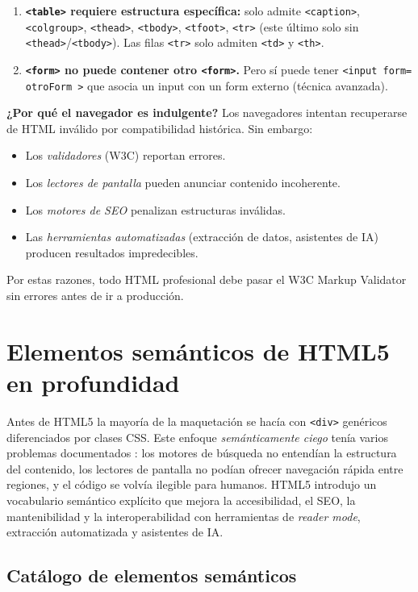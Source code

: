 \begin{enumerate}
\item \textbf{\texttt{<table>} requiere estructura específica:}
solo admite \texttt{<caption>}, \texttt{<colgroup>}, \texttt{<thead>},
\texttt{<tbody>}, \texttt{<tfoot>}, \texttt{<tr>} (este último solo
sin \texttt{<thead>}/\texttt{<tbody>}). Las filas \texttt{<tr>} solo
admiten \texttt{<td>} y \texttt{<th>}.

\item \textbf{\texttt{<form>} no puede contener otro \texttt{<form>}.}
Pero sí puede tener \texttt{<input form= otroForm >} que asocia un
input con un form externo (técnica avanzada).
\end{enumerate}

\textbf{¿Por qué el navegador es indulgente?} Los navegadores
intentan recuperarse de HTML inválido por compatibilidad histórica.
Sin embargo:
\begin{itemize}
\item Los \emph{validadores} (W3C) reportan errores.
\item Los \emph{lectores de pantalla} pueden anunciar contenido
incoherente.
\item Los \emph{motores de SEO} penalizan estructuras inválidas.
\item Las \emph{herramientas automatizadas} (extracción de datos,
asistentes de IA) producen resultados impredecibles.
\end{itemize}

Por estas razones, todo HTML profesional debe pasar el W3C Markup
Validator \cite{w3cvalidator} sin errores antes de ir a producción.

\section{Elementos semánticos de HTML5 en profundidad}

Antes de HTML5 la mayoría de la maquetación se hacía con \texttt{<div>}
genéricos diferenciados por clases CSS. Este enfoque
\emph{semánticamente ciego} tenía varios problemas documentados
\cite{lawson2011html5}: los motores de búsqueda no entendían la
estructura del contenido, los lectores de pantalla no podían
ofrecer navegación rápida entre regiones, y el código se volvía
ilegible para humanos. HTML5 introdujo un vocabulario semántico
explícito que mejora la accesibilidad, el SEO, la mantenibilidad y
la interoperabilidad con herramientas de \emph{reader mode},
extracción automatizada y asistentes de IA.

\subsection{Catálogo de elementos semánticos}

